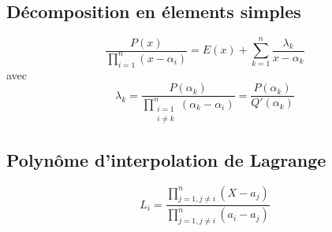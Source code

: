 \documentclass[]{article}
\begin{document}
\subsection*{Décomposition en élements simples}
\[ \frac{P(x)}{\prod_{i=1}^n (x- \alpha_i) } = E(x) + \sum_{k=1}^{n} \frac{\lambda_k}{x-\alpha_k} \]
avec
\[ \lambda_k = \frac{P(\alpha_k)}{\prod_{\substack{i=1 \\ i \neq k}}^{n}(\alpha_k - \alpha_i)} = \frac{P(\alpha_k)}{Q'(\alpha_k)} \]

\subsection*{Polynôme d'interpolation de Lagrange}

\[ L_i = \frac{\prod_{j=1, j\neq i}^{n} (X-a_j)}{\prod_{j=1, j\neq i}^{n} (a_i-a_j)} \]
\end{document}
